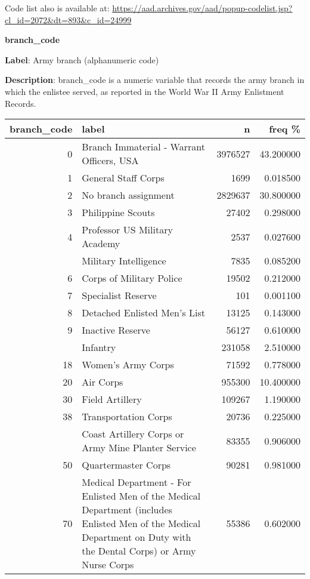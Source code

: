 \documentclass[
]{article}
\begin{document}
Code list also is available at:
\url{https://aad.archives.gov/aad/popup-codelist.jsp?cl_id=2072\&dt=893\&c_id=24999}

\newpage

\textbf{\huge branch\_code} \normalsize \vspace{12pt}

\textbf{Label}: Army branch (alphanumeric code)

\textbf{Description}: branch\_code is a numeric variable that records
the army branch in which the enlistee served, as reported in the World
War II Army Enlistment Records.

\vspace{10 pt}

\begin{table}
\centering
\begin{tabular}{r>{\raggedright\arraybackslash}p{9cm}rr}
\toprule
branch\_code & label & n & freq \%\\
\midrule
0 & Branch Immaterial - Warrant Officers, USA & 3976527 & 43.200000\\
1 & General Staff Corps & 1699 & 0.018500\\
2 & No branch assignment & 2829637 & 30.800000\\
3 & Philippine Scouts & 27402 & 0.298000\\
4 & Professor US Military Academy & 2537 & 0.027600\\
\addlinespace
5 & Military Intelligence & 7835 & 0.085200\\
6 & Corps of Military Police & 19502 & 0.212000\\
7 & Specialist Reserve & 101 & 0.001100\\
8 & Detached Enlisted Men's List & 13125 & 0.143000\\
9 & Inactive Reserve & 56127 & 0.610000\\
\addlinespace
10 & Infantry & 231058 & 2.510000\\
18 & Women's Army Corps & 71592 & 0.778000\\
20 & Air Corps & 955300 & 10.400000\\
30 & Field Artillery & 109267 & 1.190000\\
38 & Transportation Corps & 20736 & 0.225000\\
\addlinespace
40 & Coast Artillery Corps or Army Mine Planter Service & 83355 & 0.906000\\
50 & Quartermaster Corps & 90281 & 0.981000\\
70 & Medical Department  - For Enlisted Men of the Medical Department (includes Enlisted Men of the Medical Department on Duty with the Dental Corps) or Army Nurse Corps & 55386 & 0.602000\\

\end{tabular}
\end{table}
\end{document}
